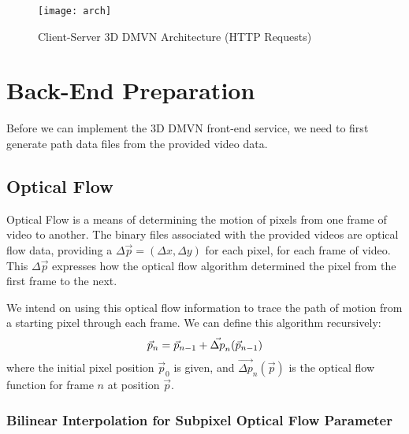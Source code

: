 \begin{figure}[h]
\centering
\texttt{[image: arch]}
\caption{Client-Server 3D DMVN Architecture (HTTP Requests)}
\end{figure}

\section{Back-End Preparation}
Before we can implement the 3D DMVN front-end service, we need to first generate path data files from the provided video data.

\subsection{Optical Flow}
Optical Flow is a means of determining the motion of pixels from one frame of video to another. The binary files associated with the provided videos are optical flow data, providing a $\Delta \vec{p} = (\Delta x, \Delta y)$ for each pixel, for each frame of video. This $\Delta \vec{p}$ expresses how the optical flow algorithm determined the pixel from the first frame to the next.\cite{opticalflow}
\par We intend on using this optical flow information to trace the path of motion from a starting pixel through each frame. We can define this algorithm recursively:
\begin{equation}
    \vec{p}_n = \vec{p}_{n-1} + \vec{\Delta p}_n(\vec{p}_{n-1}) \\
\end{equation}
where the initial pixel position $\vec{p}_0$ is given, and $\vec{\Delta p}_n(\vec{p})$ is the optical flow function for frame $n$ at position $\vec{p}$.

\subsubsection{Bilinear Interpolation for Subpixel Optical Flow Parameter}

